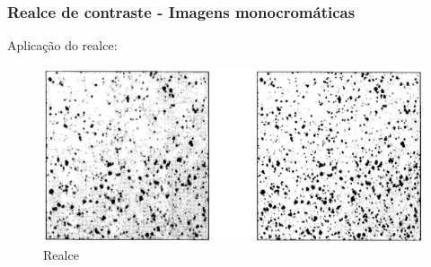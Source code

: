 \documentclass[aspectratio=169]{beamer}
\theoremstyle{Definition}
\begin{document}
\begin{frame}
	\frametitle{Realce de contraste - Imagens monocromáticas}
	
	Aplicação do realce: 
	\begin{figure}[h]
	 	\includegraphics[width=0.6\paperwidth,height=0.6\paperheight]{imagens/realce1}
		\caption{Realce}\label{figLogical}
	\end{figure}
	
\end{frame}
\end{document}
